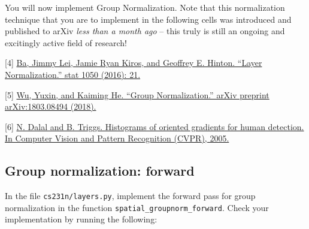 \documentclass[11pt]{article}
\begin{document}
You will now implement Group Normalization. Note that this normalization
technique that you are to implement in the following cells was
introduced and published to arXiv \emph{less than a month ago} -- this
truly is still an ongoing and excitingly active field of research!

{[}4{]} \href{https://arxiv.org/pdf/1607.06450.pdf}{Ba, Jimmy Lei, Jamie
Ryan Kiros, and Geoffrey E. Hinton. ``Layer Normalization.'' stat 1050
(2016): 21.}

{[}5{]} \href{https://arxiv.org/abs/1803.08494}{Wu, Yuxin, and Kaiming
He. ``Group Normalization.'' arXiv preprint arXiv:1803.08494 (2018).}

{[}6{]} \href{https://ieeexplore.ieee.org/abstract/document/1467360/}{N.
Dalal and B. Triggs. Histograms of oriented gradients for human
detection. In Computer Vision and Pattern Recognition (CVPR), 2005.}

    \hypertarget{group-normalization-forward}{%
\subsection{Group normalization:
forward}\label{group-normalization-forward}}

In the file \texttt{cs231n/layers.py}, implement the forward pass for
group normalization in the function
\texttt{spatial\_groupnorm\_forward}. Check your implementation by
running the following:
\end{document}
